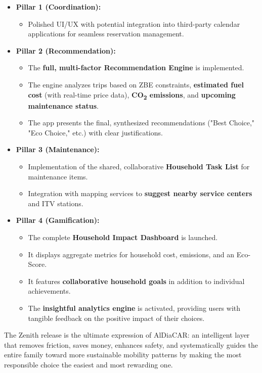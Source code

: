 \begin{itemize}
    \item \textbf{Pillar 1 (Coordination):}
    \begin{itemize}
        \item Polished UI/UX with potential integration into third-party calendar applications for seamless reservation management.
    \end{itemize}
    \item \textbf{Pillar 2 (Recommendation):}
    \begin{itemize}
        \item The \textbf{full, multi-factor Recommendation Engine} is implemented.
        \item The engine analyzes trips based on ZBE constraints, \textbf{estimated fuel cost} (with real-time price data), \textbf{CO\textsubscript{2} emissions}, and \textbf{upcoming maintenance status}.
        \item The app presents the final, synthesized recommendations ("Best Choice," "Eco Choice," etc.) with clear justifications.
    \end{itemize}
    \item \textbf{Pillar 3 (Maintenance):}
    \begin{itemize}
        \item Implementation of the shared, collaborative \textbf{Household Task List} for maintenance items.
        \item Integration with mapping services to \textbf{suggest nearby service centers} and ITV stations.
    \end{itemize}
    \item \textbf{Pillar 4 (Gamification):}
    \begin{itemize}
        \item The complete \textbf{Household Impact Dashboard} is launched.
        \item It displays aggregate metrics for household cost, emissions, and an Eco-Score.
        \item It features \textbf{collaborative household goals} in addition to individual achievements.
        \item The \textbf{insightful analytics engine} is activated, providing users with tangible feedback on the positive impact of their choices.
    \end{itemize}
\end{itemize}

The Zenith release is the ultimate expression of AlDiaCAR: an intelligent layer that removes friction, saves money, enhances safety, and systematically guides the entire family toward more sustainable mobility patterns by making the most responsible choice the easiest and most rewarding one.
